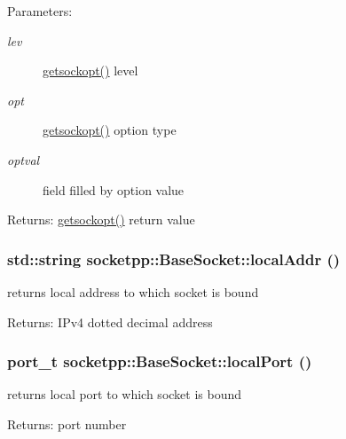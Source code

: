 \begin{CompactItemize}
\begin{Desc}
\item[Parameters:]
\begin{description}
\item[{\em lev}]\hyperlink{classsocketpp_1_1BaseSocket_c845c3a037f0f400fd50dfb58706b6e4}{getsockopt()} level \item[{\em opt}]\hyperlink{classsocketpp_1_1BaseSocket_c845c3a037f0f400fd50dfb58706b6e4}{getsockopt()} option type \item[{\em optval}]field filled by option value \end{description}
\end{Desc}
\begin{Desc}
\item[Returns:]\hyperlink{classsocketpp_1_1BaseSocket_c845c3a037f0f400fd50dfb58706b6e4}{getsockopt()} return value \end{Desc}
\hypertarget{classsocketpp_1_1BaseSocket_0caed2e7d3f0e4db7d4c1aa3aba52caf}{
\subsubsection[{localAddr}]{\setlength{\rightskip}{0pt plus 5cm}std::string socketpp::BaseSocket::localAddr ()}}
\label{classsocketpp_1_1BaseSocket_0caed2e7d3f0e4db7d4c1aa3aba52caf}


returns local address to which socket is bound 

\begin{Desc}
\item[Returns:]IPv4 dotted decimal address \end{Desc}
\hypertarget{classsocketpp_1_1BaseSocket_d4a2c0e4932436ef61f911514385d16c}{
\subsubsection[{localPort}]{\setlength{\rightskip}{0pt plus 5cm}port\_\-t socketpp::BaseSocket::localPort ()}}
\label{classsocketpp_1_1BaseSocket_d4a2c0e4932436ef61f911514385d16c}


returns local port to which socket is bound 

\begin{Desc}
\item[Returns:]port number \end{Desc}
\hypertarget{classsocketpp_1_1BaseSocket_2060dc1b648f83f8bf5ae3d9ecfcd619}{
}
\end{CompactItemize}
